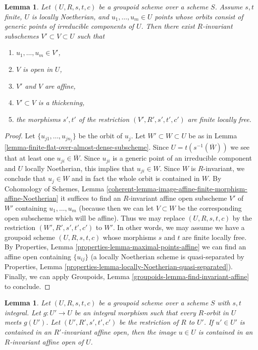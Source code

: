\documentclass{stacks-project}
\theoremstyle{plain}
\newtheorem{lemma}[subsection]{Lemma}
\theoremstyle{definition}
\theoremstyle{remark}
\numberwithin{equation}{subsection}
\begin{document}
\begin{lemma}
\label{lemma-invariant-affine-open-around-generic-point-Noetherian}
Let $(U, R, s, t, c)$ be a groupoid scheme over a scheme $S$.
Assume $s, t$ finite, $U$ is locally Noetherian, and $u_1, \ldots, u_m \in U$
points whose orbits consist of generic points of irreducible
components of $U$. Then there exist $R$-invariant subschemes
$V' \subset V \subset U$ such that
\begin{enumerate}
\item $u_1, \ldots, u_m \in V'$,
\item $V$ is open in $U$,
\item $V'$ and $V$ are affine,
\item $V' \subset V$ is a thickening,
\item the morphisms $s', t'$ of the restriction $(V', R', s', t', c')$
are finite locally free.
\end{enumerate}
\end{lemma}

\begin{proof}
Let $\{u_{j1}, \ldots, u_{jn_j}\}$ be the orbit of $u_j$.
Let $W' \subset W \subset U$ be as in
Lemma \ref{lemma-finite-flat-over-almost-dense-subscheme}.
Since $U = t(s^{-1}(\overline{W}))$ we see that at least
one $u_{ji} \in \overline{W}$. Since $u_{ji}$ is a generic point
of an irreducible component and $U$ locally Noetherian,
this implies that $u_{ji} \in W$. Since $W$ is $R$-invariant, we
conclude that $u_j \in W$ and in fact the whole orbit is contained in $W$.
By Cohomology of Schemes, Lemma
\ref{coherent-lemma-image-affine-finite-morphism-affine-Noetherian}
it suffices to find an $R$-invariant affine open subscheme $V'$
of $W'$ containing $u_1, \ldots, u_m$ (because then we can let $V \subset W$
be the corresponding open subscheme which will be affine).
Thus we may replace $(U, R, s, t, c)$
by the restriction $(W', R', s', t', c')$ to $W'$.
In other words, we may assume we have a groupoid scheme $(U, R, s, t, c)$
whose morphisms $s$ and $t$ are finite locally free.
By Properties, Lemma \ref{properties-lemma-maximal-points-affine}
we can find an affine open containing $\{u_{ij}\}$
(a locally Noetherian scheme is quasi-separated by
Properties, Lemma \ref{properties-lemma-locally-Noetherian-quasi-separated}).
Finally, we can apply
Groupoids, Lemma \ref{groupoids-lemma-find-invariant-affine}
to conclude.
\end{proof}

\begin{lemma}
\label{lemma-find-affine-integral}
Let $(U, R, s, t, c)$ be a groupoid scheme over a scheme $S$
with $s, t$ integral. Let $g : U' \to U$ be an integral morphism
such that every $R$-orbit in $U$ meets $g(U')$. Let $(U', R', s', t', c')$
be the restriction of $R$ to $U'$. If $u' \in U'$ is contained in an
$R'$-invariant affine open, then the image $u \in U$ is contained
in an $R$-invariant affine open of $U$.
\end{lemma}
\end{document}
